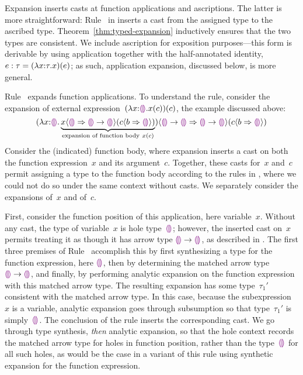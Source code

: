 Expansion inserts casts at function applications and ascriptions.
%
The latter is more straightforward: Rule~
in  inserts a cast from the assigned type to the
ascribed type.
%
Theorem~\ref{thm:typed-expansion} inductively ensures that the two
types are consistent.
%
We include ascription for exposition purposes---this form is derivable
by using application together with the half-annotated identity, $e
: \tau = (\lambda x{:}\tau.x)(e)$; as such, application
expansion, discussed below, is more general.

Rule~ expands function applications.
%
To understand the rule, consider the expansion of external
expression~$(\lambda x{:}\textcolor{violet}{\llparenthesis}\textcolor{violet}{\rrparenthesis}.x(c))(c)$, the example
discussed above:
\[
        \hap{\dcasttwo{
        (\halam{x}{\tehole}{\underbrace{
                \hap{\dcasttwo{x}{\tehole}{\tarr{\tehole}{\tehole}}}
                {\dcasttwo{c}{b}{\tehole}}
                }_{\textrm{expansion of function body}~x(c)}
        }
        )}{\tarr{\tehole}{\tehole}}{
           \tarr{\tehole}{\tehole}}
           }
           {\dcasttwo{c}{b}{\tehole}}
\]
Consider the (indicated) function body,
%
where expansion inserts a cast on both the function expression~$x$ and its argument~$c$.
%
Together, these casts for~$x$ and~$c$ permit assigning a type to the
function body according to the rules in , where we
could not do so under the same context without casts.
%
We separately consider the expansions of~$x$ and of~$c$.

First, consider the function position of this application, here variable~$x$.
%
Without any cast, the type of variable~$x$ is hole type~$\textcolor{violet}{\llparenthesis}\textcolor{violet}{\rrparenthesis}$;
however, the inserted cast on~$x$ permits treating it as though it has
arrow type $\textcolor{violet}{\llparenthesis}\textcolor{violet}{\rrparenthesis} \rightarrow \textcolor{violet}{\llparenthesis}\textcolor{violet}{\rrparenthesis}$, as described
in .
%
The first three premises of Rule~ accomplish this
%
by first synthesizing a type for the function expression, here
$\textcolor{violet}{\llparenthesis}\textcolor{violet}{\rrparenthesis}$, then
%
by determining the matched arrow type~$\textcolor{violet}{\llparenthesis}\textcolor{violet}{\rrparenthesis} \rightarrow \textcolor{violet}{\llparenthesis}\textcolor{violet}{\rrparenthesis}$, and
finally,
%
by performing analytic expansion on the function expression with this
matched arrow type.
%
The resulting expansion has some type~$\tau_1'$ consistent with the matched arrow type.
%
In this case, because the subexpression~$x$ is a variable, analytic
expansion goes through subsumption so that type~$\tau_1'$ is
simply~$\textcolor{violet}{\llparenthesis}\textcolor{violet}{\rrparenthesis}$.
%
The conclusion of the rule inserts the corresponding cast.
%
We go through type synthesis, \emph{then} analytic expansion, so that the hole
context records the matched arrow type for holes in function position,
rather than the type~$\textcolor{violet}{\llparenthesis}\textcolor{violet}{\rrparenthesis}$ for all such holes, as would be the case
in a variant of this rule using synthetic expansion for the function
expression.

